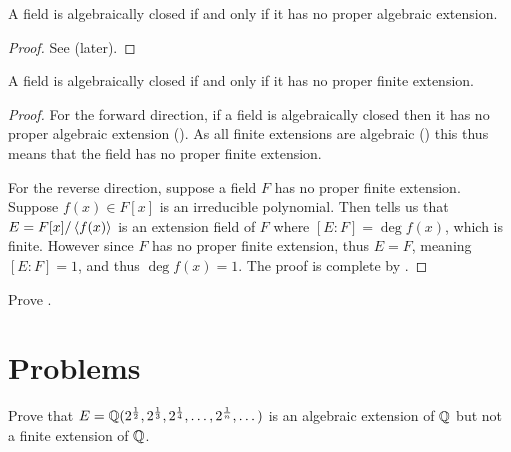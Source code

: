 \begin{corollary}\label{corollary-field-is-algebraically-closed-iff-no-proper-algebraic-extension}
    A field is algebraically closed if and only if it has no proper algebraic extension.
\end{corollary}
\begin{proof}
    See  (later).
\end{proof}

\begin{corollary}\label{corollary-field-is-algebraically-closed-iff-no-proper-finite-extension}
    A field is algebraically closed if and only if it has no proper finite extension.
\end{corollary}
\begin{proof}
    For the forward direction, if a field is algebraically closed then it has no proper algebraic extension (). As all finite extensions are algebraic () this thus means that the field has no proper finite extension.

    For the reverse direction, suppose a field $F$ has no proper finite extension. Suppose $f(x) \in F[x]$ is an irreducible polynomial. Then  tells us that $E = F[x]/\left\langle f(x)\right\rangle$ is an extension field of $F$ where $[E:F] = \deg f(x)$, which is finite. However since $F$ has no proper finite extension, thus $E = F$, meaning $[E:F] = 1$, and thus $\deg f(x) = 1$. The proof is complete by .
\end{proof}

\begin{exercise}\label{exercise-field-is-algebraically-closed-iff-no-proper-algebraic-extension}
    Prove .
\end{exercise}



\section{Problems}
\begin{problem}
    Prove that $E = \mathbb{Q}(2^{\frac12}, 2^{\frac13}, 2^{\frac14}, \dots, 2^{\frac1n}, \dots)$ is an algebraic extension of $\mathbb{Q}$ but not a finite extension of $\mathbb{Q}$.
\end{problem}

